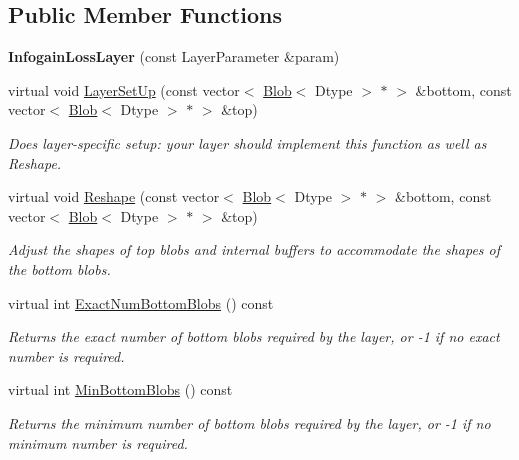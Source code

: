 \subsection*{Public Member Functions}
\begin{DoxyCompactItemize}
\item 
{\bfseries Infogain\+Loss\+Layer} (const Layer\+Parameter \&param)\hypertarget{classcaffe_1_1InfogainLossLayer_ac2269ba8dc7d18fa8fab90ea9f295784}{}\label{classcaffe_1_1InfogainLossLayer_ac2269ba8dc7d18fa8fab90ea9f295784}

\item 
virtual void \hyperlink{classcaffe_1_1InfogainLossLayer_a55a1d7ae2db81750c33ef9286764cd29}{Layer\+Set\+Up} (const vector$<$ \hyperlink{classcaffe_1_1Blob}{Blob}$<$ Dtype $>$ $\ast$ $>$ \&bottom, const vector$<$ \hyperlink{classcaffe_1_1Blob}{Blob}$<$ Dtype $>$ $\ast$ $>$ \&top)
\begin{DoxyCompactList}\small\item\em Does layer-\/specific setup\+: your layer should implement this function as well as Reshape. \end{DoxyCompactList}\item 
virtual void \hyperlink{classcaffe_1_1InfogainLossLayer_aa1c32ab8252309cb51ed44cacf88f119}{Reshape} (const vector$<$ \hyperlink{classcaffe_1_1Blob}{Blob}$<$ Dtype $>$ $\ast$ $>$ \&bottom, const vector$<$ \hyperlink{classcaffe_1_1Blob}{Blob}$<$ Dtype $>$ $\ast$ $>$ \&top)
\begin{DoxyCompactList}\small\item\em Adjust the shapes of top blobs and internal buffers to accommodate the shapes of the bottom blobs. \end{DoxyCompactList}\item 
virtual int \hyperlink{classcaffe_1_1InfogainLossLayer_aef9aa9200a3129d7bddf56f717017cbb}{Exact\+Num\+Bottom\+Blobs} () const 
\begin{DoxyCompactList}\small\item\em Returns the exact number of bottom blobs required by the layer, or -\/1 if no exact number is required. \end{DoxyCompactList}\item 
virtual int \hyperlink{classcaffe_1_1InfogainLossLayer_a71105feb6b206d7f807c86d7dc303c64}{Min\+Bottom\+Blobs} () const 
\begin{DoxyCompactList}\small\item\em Returns the minimum number of bottom blobs required by the layer, or -\/1 if no minimum number is required. \end{DoxyCompactList}\item 

\end{DoxyCompactItemize}
